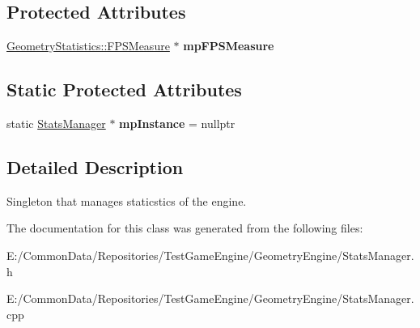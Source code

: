 \subsection*{Protected Attributes}
\begin{DoxyCompactItemize}
\item 
\mbox{\label{class_geometry_engine_1_1_stats_manager_aee8d5fa0c0086e34da22581d51e6ad50}} 
\mbox{\hyperlink{class_geometry_engine_1_1_geometry_statistics_1_1_f_p_s_measure}{Geometry\+Statistics\+::\+F\+P\+S\+Measure}} $\ast$ {\bfseries mp\+F\+P\+S\+Measure}
\end{DoxyCompactItemize}
\subsection*{Static Protected Attributes}
\begin{DoxyCompactItemize}
\item 
\mbox{\label{class_geometry_engine_1_1_stats_manager_afe8def61bb479e7b17cba99f5fdd5b3f}} 
static \mbox{\hyperlink{class_geometry_engine_1_1_stats_manager}{Stats\+Manager}} $\ast$ {\bfseries mp\+Instance} = nullptr
\end{DoxyCompactItemize}


\subsection{Detailed Description}
Singleton that manages staticstics of the engine. 

The documentation for this class was generated from the following files\+:\begin{DoxyCompactItemize}
\item 
E\+:/\+Common\+Data/\+Repositories/\+Test\+Game\+Engine/\+Geometry\+Engine/Stats\+Manager.\+h\item 
E\+:/\+Common\+Data/\+Repositories/\+Test\+Game\+Engine/\+Geometry\+Engine/Stats\+Manager.\+cpp\end{DoxyCompactItemize}
